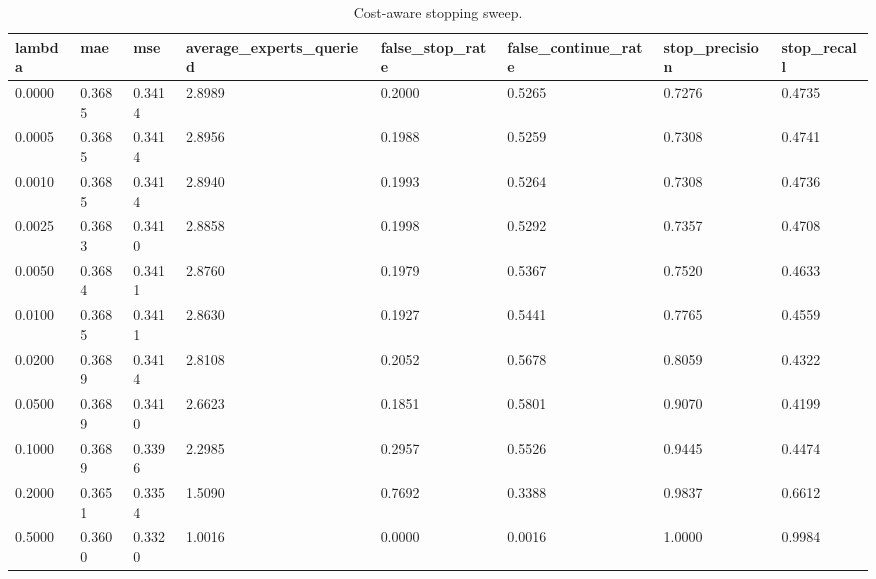 \begin{table}
\caption{Cost-aware stopping sweep.}
\label{tab:costarts-cost-sweep}
\begin{tabular}{llllllll}
\toprule
lambda & mae & mse & average\_experts\_queried & false\_stop\_rate & false\_continue\_rate & stop\_precision & stop\_recall \\
\midrule
0.0000 & 0.3685 & 0.3414 & 2.8989 & 0.2000 & 0.5265 & 0.7276 & 0.4735 \\
0.0005 & 0.3685 & 0.3414 & 2.8956 & 0.1988 & 0.5259 & 0.7308 & 0.4741 \\
0.0010 & 0.3685 & 0.3414 & 2.8940 & 0.1993 & 0.5264 & 0.7308 & 0.4736 \\
0.0025 & 0.3683 & 0.3410 & 2.8858 & 0.1998 & 0.5292 & 0.7357 & 0.4708 \\
0.0050 & 0.3684 & 0.3411 & 2.8760 & 0.1979 & 0.5367 & 0.7520 & 0.4633 \\
0.0100 & 0.3685 & 0.3411 & 2.8630 & 0.1927 & 0.5441 & 0.7765 & 0.4559 \\
0.0200 & 0.3689 & 0.3414 & 2.8108 & 0.2052 & 0.5678 & 0.8059 & 0.4322 \\
0.0500 & 0.3689 & 0.3410 & 2.6623 & 0.1851 & 0.5801 & 0.9070 & 0.4199 \\
0.1000 & 0.3689 & 0.3396 & 2.2985 & 0.2957 & 0.5526 & 0.9445 & 0.4474 \\
0.2000 & 0.3651 & 0.3354 & 1.5090 & 0.7692 & 0.3388 & 0.9837 & 0.6612 \\
0.5000 & 0.3600 & 0.3320 & 1.0016 & 0.0000 & 0.0016 & 1.0000 & 0.9984 \\
\bottomrule
\end{tabular}
\end{table}
